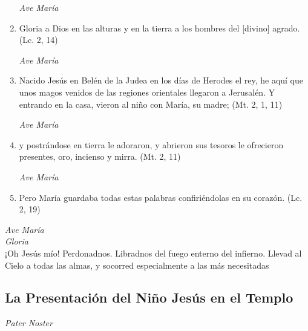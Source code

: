 \documentclass[a4paper,11pt, oneside]{report}
\begin{document}
\begin{enumerate}
        \textit{Ave María}

        \item Gloria a Dios en las alturas y en la tierra a los hombres del [divino] agrado. (Lc. 2, 14)

        \textit{Ave María}

        \item Nacido Jesús en Belén de la Judea en los días de Herodes el rey, he aquí que unos magos venidos de las regiones orientales llegaron a Jerusalén.
        Y entrando en la casa, vieron al niño con María, su madre; (Mt. 2, 1, 11)
        
        \textit{Ave María}

        \item y postrándose en tierra le adoraron, y abrieron sus tesoros le ofrecieron presentes, oro, incienso y mirra. (Mt. 2, 11)
        
        \textit{Ave María}

        \item Pero María guardaba todas estas palabras confiriéndolas en su corazón. (Lc. 2, 19)

      \end{enumerate}

      \textit{Ave María} \\
      \indent\textit{Gloria} \\
      \indent¡Oh Jesús mío! Perdonadnos. Libradnos del fuego enterno del infierno. Llevad al Cielo a todas las almas, y socorred especialmente a las más 
      necesitadas

    \subsection*{ La Presentación del Niño Jesús en el Templo }
      
      \textit{Pater Noster}
\end{document}
